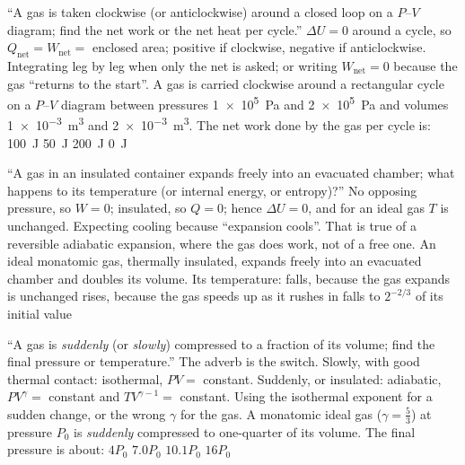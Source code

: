 {``A gas is taken clockwise (or anticlockwise) around a closed loop on a $P$--$V$ diagram; find the net work or
the net heat per cycle.''}
{$\Delta U=0$ around a cycle, so $Q_{\text{net}}=W_{\text{net}}=$ enclosed area; positive if clockwise,
negative if anticlockwise.}
{Integrating leg by leg when only the net is asked; or writing $W_{\text{net}}=0$ because the gas ``returns to
the start''.}
{A gas is carried clockwise around a rectangular cycle on a $P$--$V$ diagram between pressures \SI{1e5}{Pa} and
\SI{2e5}{Pa} and volumes \SI{1e-3}{m^3} and \SI{2e-3}{m^3}. The net work done by the gas per cycle is:}
{\SI{100}{J}}
{\SI{50}{J}}
{\SI{200}{J}}
{\SI{0}{J}}

{``A gas in an insulated container expands freely into an evacuated chamber; what happens to its temperature
(or internal energy, or entropy)?''}
{No opposing pressure, so $W=0$; insulated, so $Q=0$; hence $\Delta U=0$, and for an ideal gas $T$ is
unchanged.}
{Expecting cooling because ``expansion cools''. That is true of a reversible adiabatic expansion, where the gas
does work, not of a free one.}
{An ideal monatomic gas, thermally insulated, expands freely into an evacuated chamber and doubles its volume.
Its temperature:}
{falls, because the gas expands}
{is unchanged}
{rises, because the gas speeds up as it rushes in}
{falls to $2^{-2/3}$ of its initial value}

{``A gas is \emph{suddenly} (or \emph{slowly}) compressed to a fraction of its volume; find the final pressure
or temperature.'' The adverb is the switch.}
{Slowly, with good thermal contact: isothermal, $PV=$ constant. Suddenly, or insulated: adiabatic,
$PV^\gamma=$ constant and $TV^{\gamma-1}=$ constant.}
{Using the isothermal exponent for a sudden change, or the wrong $\gamma$ for the gas.}
{A monatomic ideal gas ($\gamma=\tfrac53$) at pressure $P_0$ is \emph{suddenly} compressed to one-quarter of its
volume. The final pressure is about:}
{$4P_0$}
{$7.0P_0$}
{$10.1P_0$}
{$16P_0$}

